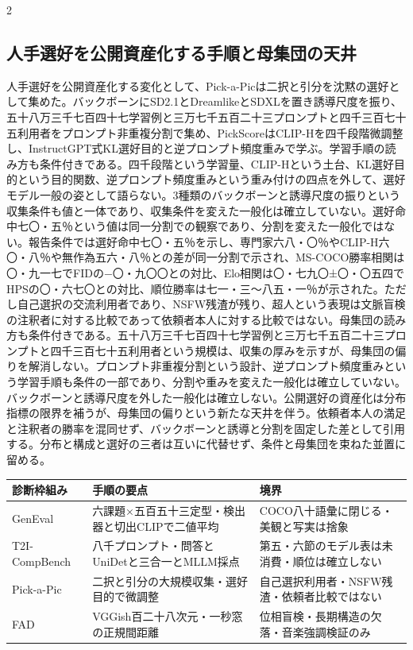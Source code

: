 \documentclass[lualatex,a4paper,10pt]{jlreq}
\begin{document}
\begin{multicols}{2}
\subsection{人手選好を公開資産化する手順と母集団の天井}
人手選好を公開資産化する変化として、Pick-a-Picは二択と引分を沈黙の選好として集めた。バックボーンにSD2.1とDreamlikeとSDXLを置き誘導尺度を振り、五十八万三千七百四十七学習例と三万七千五百二十三プロンプトと四千三百七十五利用者をプロンプト非重複分割で集め、PickScoreはCLIP-Hを四千段階微調整し、InstructGPT式KL選好目的と逆プロンプト頻度重みで学ぶ\autocite{btd087}。学習手順の読み方も条件付きである。四千段階という学習量、CLIP-Hという土台、KL選好目的という目的関数、逆プロンプト頻度重みという重み付けの四点を外して、選好モデル一般の姿として語らない。3種類のバックボーンと誘導尺度の振りという収集条件も値と一体であり、収集条件を変えた一般化は確立していない。選好命中七〇・五％という値は同一分割での観察であり、分割を変えた一般化ではない\autocite{btd087}。報告条件では選好命中七〇・五％を示し、専門家六八・〇％やCLIP-H六〇・八％や無作為五六・八％との差が同一分割で示され、MS-COCO勝率相関は〇・九一七でFIDの−〇・九〇〇との対比、Elo相関は〇・七九〇±〇・〇五四でHPSの〇・六七〇との対比、順位勝率は七一・三〜八五・一％が示された\autocite{btd087}。ただし自己選択の交流利用者であり、NSFW残渣が残り、超人という表現は文脈盲検の注釈者に対する比較であって依頼者本人に対する比較ではない\autocite{btd087}。母集団の読み方も条件付きである。五十八万三千七百四十七学習例と三万七千五百二十三プロンプトと四千三百七十五利用者という規模は、収集の厚みを示すが、母集団の偏りを解消しない。プロンプト非重複分割という設計、逆プロンプト頻度重みという学習手順も条件の一部であり、分割や重みを変えた一般化は確立していない\autocite{btd087}。バックボーンと誘導尺度を外した一般化は確立しない。公開選好の資産化は分布指標の限界を補うが、母集団の偏りという新たな天井を伴う。依頼者本人の満足と注釈者の勝率を混同せず、バックボーンと誘導と分割を固定した差として引用する。分布と構成と選好の三者は互いに代替せず、条件と母集団を束ねた並置に留める。
\end{multicols}

\begin{center}
\small
\begin{tabularx}{\textwidth}{@{}p{}p{}X@{}}
\toprule
診断枠組み & 手順の要点 & 境界 \\
\midrule
GenEval & 六課題×五百五十三定型・検出器と切出CLIPで二値平均 & COCO八十語彙に閉じる・美観と写実は捨象 \\
T2I-CompBench & 八千プロンプト・問答とUniDetと三合一とMLLM採点 & 第五・六節のモデル表は未消費・順位は確立しない \\
Pick-a-Pic & 二択と引分の大規模収集・選好目的で微調整 & 自己選択利用者・NSFW残渣・依頼者比較ではない \\
FAD & VGGish百二十八次元・一秒窓の正規間距離 & 位相盲検・長期構造の欠落・音楽強調検証のみ \\
\bottomrule
\end{tabularx}
\end{center}
\autocite{btd085,btd086,btd087,btd088}
\end{document}
